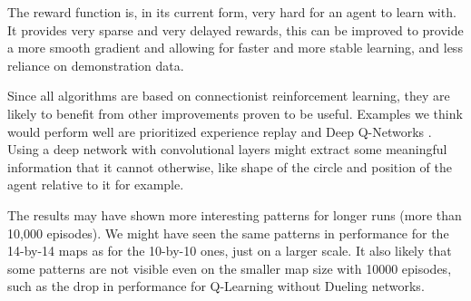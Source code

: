 The reward function is, in its current form, very hard for an agent to learn with. It provides very sparse and very delayed rewards, this can be improved to provide a more smooth gradient and allowing for faster and more stable learning, and less reliance on demonstration data. 

Since all algorithms are based on connectionist reinforcement learning, they are likely to benefit from other improvements proven to be useful. Examples we think would perform well are prioritized experience replay \citep{schaul2015prioritized} and Deep Q-Networks \citep{mnih2015human}. Using a deep network with convolutional layers might extract some meaningful information that it cannot otherwise, like shape of the circle and position of the agent relative to it for example.

The results may have shown more interesting patterns for longer runs (more than 10,000 episodes). We might have seen the same patterns in performance for the 14-by-14 maps as for the 10-by-10 ones, just on a larger scale. It also likely that some patterns are not visible even on the smaller map size with 10000 episodes, such as the drop in performance for Q-Learning without Dueling networks.

